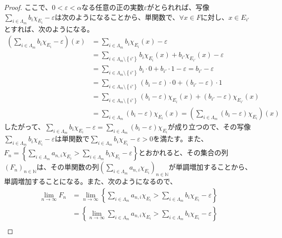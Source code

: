 \documentclass[dvipdfmx]{jsarticle}
\begin{document}
\begin{proof}
ここで、$0 < \varepsilon < \alpha$なる任意の正の実数$\varepsilon$がとられれば、写像$\sum_{i \in \varLambda_{m}} {b_{i}\chi_{E_{i}}} - \varepsilon$は次のようになることから、単関数で、$\forall x \in F$に対し、$x \in E_{i'}$とすれば、次のようになる。
\begin{align*}
\left( \sum_{i \in \varLambda_{m}} {b_{i}\chi_{E_{i}}} - \varepsilon \right)(x) &= \sum_{i \in \varLambda_{m}} {b_{i}\chi_{E_{i}}(x)} - \varepsilon\\
&= \sum_{i \in \varLambda_{m} \setminus \left\{ i' \right\}} {b_{i}\chi_{E_{i}}(x)} + b_{i'}\chi_{E_{i'}}(x) - \varepsilon\\
&= \sum_{i \in \varLambda_{m} \setminus \left\{ i' \right\}} {b_{i} \cdot 0} + b_{i'} \cdot 1 - \varepsilon = b_{i'} - \varepsilon\\
&= \sum_{i \in \varLambda_{m} \setminus \left\{ i' \right\}} {\left( b_{i} - \varepsilon \right) \cdot 0} + \left( b_{i'} - \varepsilon \right) \cdot 1\\
&= \sum_{i \in \varLambda_{m} \setminus \left\{ i' \right\}} {\left( b_{i} - \varepsilon \right)\chi_{E_{i}}(x)} + \left( b_{i'} - \varepsilon \right)\chi_{E_{i'}}(x)\\
&= \sum_{i \in \varLambda_{m}} {\left( b_{i} - \varepsilon \right)\chi_{E_{i}}(x)} = \left( \sum_{i \in \varLambda_{m}} {\left( b_{i} - \varepsilon \right)\chi_{E_{i}}} \right)(x)
\end{align*}
したがって、$\sum_{i \in \varLambda_{m}} {b_{i}\chi_{E_{i}}} - \varepsilon = \sum_{i \in \varLambda_{m}} {\left( b_{i} - \varepsilon \right)\chi_{E_{i}}}$が成り立つので、その写像$\sum_{i \in \varLambda_{m}} {b_{i}\chi_{E_{i}}} - \varepsilon$は単関数で$\sum_{i \in \varLambda_{m}} {b_{i}\chi_{E_{i}}} - \varepsilon > 0$を満たす。また、$F_{n} = \left\{ \sum_{i \in \varLambda_{m}} {a_{n,i}\chi_{E_{i}}} > \sum_{i \in \varLambda_{m}} {b_{i}\chi_{E_{i}}} - \varepsilon \right\}$とおかれると、その集合の列$\left( F_{n} \right)_{n \in \mathbb{N}}$は、その単関数の列$\left( \sum_{i \in \varLambda_{m}} {a_{n,i}\chi_{E_{i}}} \right)_{n \in \mathbb{N}}$が単調増加することから、単調増加することになる。また、次のようになるので、
\begin{align*}
\lim_{n \rightarrow \infty}F_{n} &= \lim_{n \rightarrow \infty}\left\{ \sum_{i \in \varLambda_{m}} {a_{n,i}\chi_{E_{i}}} > \sum_{i \in \varLambda_{m}} {b_{i}\chi_{E_{i}}} - \varepsilon \right\}\\
&= \left\{ \lim_{n \rightarrow \infty}{\sum_{i \in \varLambda_{m}} {a_{n,i}\chi_{E_{i}}}} > \sum_{i \in \varLambda_{m}} {b_{i}\chi_{E_{i}}} - \varepsilon \right\}\\

\end{align*}
\end{proof}
\end{document}
